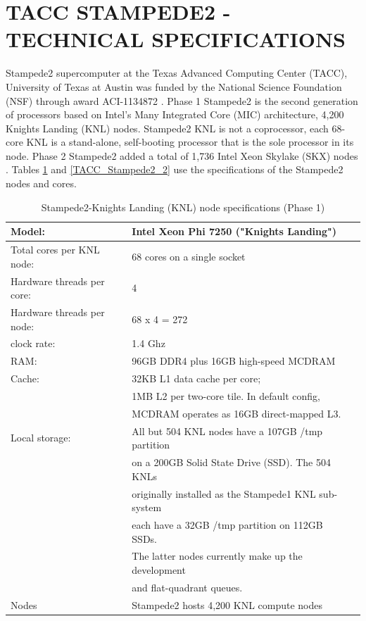 \documentclass{article}
\begin{document}
\section{TACC STAMPEDE2 - TECHNICAL SPECIFICATIONS}
Stampede2 supercomputer at the Texas Advanced Computing Center (TACC), University of Texas at Austin was funded
by the National Science Foundation (NSF) through award ACI-1134872 \cite{TACC_Stampede2}.
Phase 1 Stampede2 is the second generation of processors based on Intel's Many Integrated Core (MIC) architecture, 4,200 Knights Landing (KNL) nodes.
Stampede2 KNL is not a coprocessor, each 68-core KNL is a stand-alone, self-booting processor that is the sole processor in its node.
Phase 2 Stampede2 added a total of 1,736 Intel Xeon Skylake (SKX) nodes \cite{TACC_Stampede2}. 
Tables \ref{TACC_Stampede2_1} and \ref{TACC_Stampede2_2} use the specifications of the Stampede2 nodes and cores.

\begin{table}[!hpt]
\centering
\caption{Stampede2-Knights Landing (KNL) node specifications (Phase 1)\cite{TACC_Stampede2}}
\begin{tabular}{|l|l|l|}\hline 
Model:                     & Intel Xeon Phi 7250 ("Knights Landing")\\ \hline
Total cores per KNL node:  & 68 cores on a single socket\\ \hline
Hardware threads per core: &  4\\\hline 
Hardware threads per node: & 68 x 4 = 272\\\hline 
clock rate:                & 1.4 Ghz \\\hline
RAM: 	                   & 96GB DDR4 plus 16GB high-speed MCDRAM\\\hline 
Cache:                     & 32KB L1 data cache per core;\\
                           & 1MB L2 per two-core tile. In default config,\\
                           & MCDRAM operates as 16GB direct-mapped L3.\\\hline
Local storage:             & All but 504 KNL nodes have a 107GB /tmp partition\\
                           & on a 200GB Solid State Drive (SSD). The 504 KNLs\\
                           & originally installed as the Stampede1 KNL sub-system\\
                           & each have a 32GB /tmp partition on 112GB SSDs.\\
                           & The latter nodes currently make up the development\\
                           & and flat-quadrant queues.\\\hline 
Nodes                      & Stampede2 hosts 4,200 KNL compute nodes\\ \hline
\end{tabular}
\label{TACC_Stampede2_1}
\end{table}
\end{document}
